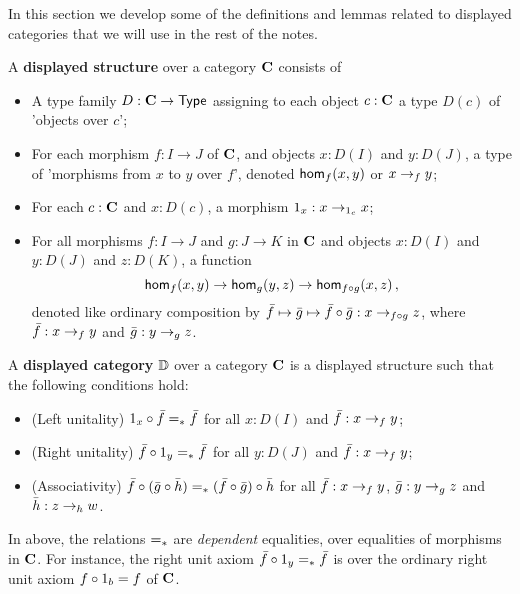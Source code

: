 In this section we develop some of the definitions
and lemmas related to displayed categories that we will use
in the rest of the notes.

\medskip


\begin{definition}
      \label{defn:displayed-structure}
       \leanok
      A \textbf{displayed structure} over a category $\catC$ consists of
      \begin{itemize}
            \item A type family $D : \catC \to \Type$ assigning to each object $c : \catC$ a type $D(c)$ of 'objects over $c$';
            \item For each morphism $f : I \to J$ of $\catC$, and objects $x : D(I)$ and $y : D(J)$, a type of 'morphisms from $x$ to $y$ over $f$',
                              denoted $\dmor{x}{f}{y}$ or $\dto{x}{f}{y}$;
            \item For each $c : \catC$ and $x : D(c)$, a morphism $1_x : \dto{x}{1_c}{x}$;
            \item For all morphisms $f : I \to J$ and $g : J \to K$ in $\catC$ and objects $x : D(I)$ and $y : D(J)$ and $z : D(K)$,
                              a function
                              $$\dmor{x}{f}{y} \to \dmor{y}{g}{z} \to \dmor{x}{\compose{f}{g}}{z} \, , $$
                              denoted like ordinary composition by $\f \mapsto \g \mapsto \compose{\f}{\g} : \dto{x}{\compose{f}{g}}{z}$, where $\f : \dto{x}{f}{y}$ and $\g : \dto{y}{g}{z}$.
            \end{itemize}
\end{definition}

\medskip

\begin{definition}
      \label{defn:displayed-category}
       \leanok
      A \textbf{displayed category} $\dcatD$ over a category $\catC$ is a displayed
      structure such that the following conditions hold:
      \begin{itemize}
            \item (Left unitality) $\compose{1_x}{\f} \depeq \f$ for all $x : D(I)$ and $\f : \dto{x}{f}{y}$;
            \item (Right unitality) $\compose{\f}{1_y} \depeq \f$ for all $y : D(J)$ and $\f : \dto{x}{f}{y}$;
            \item (Associativity) $\compose{\f}{(\compose{\g}{\h})} \depeq \compose{(\compose{\f}{\g})}{\h}$ for all $\f : \dto{x}{f}{y}$, $\g : \dto{y}{g}
            {z}$ and $\h : \dto{z}{h}{w}$.
      \end{itemize}
      In above, the relations $\depeq$ are \emph{dependent} equalities, over equalities of morphisms in $\catC$. For instance, the right unit axiom $\compose{\f}{1_y} \depeq \f$ is over the ordinary right unit axiom $\compose{f}{1_b} = f$ of $\catC$.
\end{definition}
